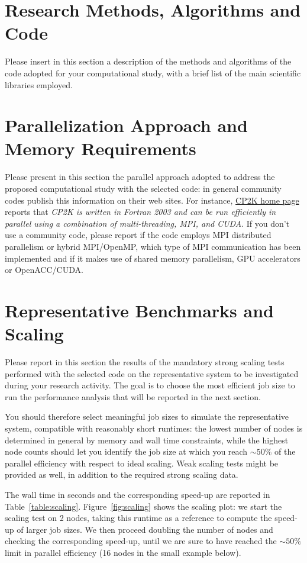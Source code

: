 \documentclass[11pt]{article}
\begin{document}
\section{Research Methods, Algorithms and Code}
Please insert in this section a description of the methods and algorithms of the code adopted for 
your computational study, with a brief list of the main scientific libraries employed. 

\section{Parallelization Approach and Memory Requirements}
Please present in this section the parallel approach adopted to address the proposed computational 
study with the selected code: in general community codes publish this information on their web sites.
For instance, \href{www.cp2k.org}{CP2K home page} reports that \emph{CP2K is written in Fortran 2003 
and can be run efficiently in parallel using a combination of multi-threading, MPI, and CUDA}.
If you don't use a community code, please report if the code employs MPI distributed parallelism or hybrid MPI/OpenMP, 
which type of MPI communication has been implemented and if it makes use of shared memory parallelism, 
GPU accelerators or OpenACC/CUDA.

\section{Representative Benchmarks and Scaling}
Please report in this section the results of the mandatory strong scaling tests performed with the 
selected code on the representative system to be investigated during your research activity. 
The goal is to choose the most efficient job size to run the performance analysis that will be 
reported in the next section. 

You should therefore select meaningful job sizes to simulate the representative system, 
compatible with reasonably short runtimes: the lowest number of nodes is determined in general 
by memory and wall time constraints, while the highest node counts should let you identify 
the job size at which you reach $\sim 50\%$ of the parallel efficiency with respect to ideal scaling. 
Weak scaling tests might be provided as well, in addition to the required strong scaling data. 

The wall time in seconds and the corresponding speed-up are reported in Table~\ref{table:scaling}. 
Figure~\ref{fig:scaling} shows the scaling plot: we start the scaling test on 2 nodes, taking this 
runtime as a reference to compute the speed-up of larger job sizes. 
We then proceed doubling the number of nodes and checking the corresponding speed-up, until we are 
sure to have reached the $\sim 50\%$ limit in parallel efficiency (16 nodes in the small example below).
\end{document}
